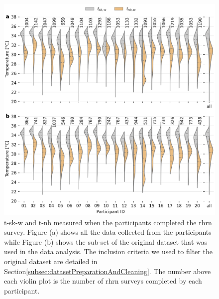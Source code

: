\begin{figure}[thb!]
     \begin{center}
         \includegraphics[width=\linewidth,height=\textheight,keepaspectratio]{figures/figure_3}
     \end{center}
     \caption{\Acf{t-sk-w} and \acf{t-nb} measured when the participants completed the \ac{rhrn} survey.
     Figure (a) shows all the data collected from the participants while Figure (b) shows the sub-set of the original dataset that was used in the data analysis.
     The inclusion criteria we used to filter the original dataset are detailed in Section\ref{subsec:datasetPreparationAndCleaning}.
     The number above each violin plot is the number of \ac{rhrn} surveys completed by each participant.
     }\label{fig:tmp_skin_nb_survey}
 \end{figure}
 
